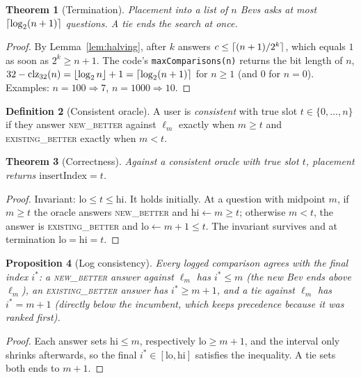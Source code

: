 \documentclass[11pt]{article}
\DeclarePairedDelimiter\floor{\lfloor}{\rfloor}
\DeclarePairedDelimiter\ceil{\lceil}{\rceil}
\newcommand{\code}[1]{\texttt{#1}}
\theoremstyle{plain}
\newtheorem{theorem}{Theorem}[section]
\newtheorem{proposition}[theorem]{Proposition}
\theoremstyle{definition}
\newtheorem{definition}[theorem]{Definition}
\theoremstyle{remark}
\begin{document}
\begin{theorem}[Termination]\label{thm:termination}
Placement into a list of $n$ Bevs asks at most $\ceil{\log_2(n+1)}$ questions. A tie ends the search at once.
\end{theorem}
\begin{proof}
By Lemma~\ref{lem:halving}, after $k$ answers $c \le \ceil{(n+1)/2^k}$, which equals $1$ as soon as $2^k \ge n + 1$. The code's \code{maxComparisons(n)} returns the bit length of $n$, $32 - \mathrm{clz}_{32}(n) = \floor{\log_2 n} + 1 = \ceil{\log_2(n+1)}$ for $n \ge 1$ (and $0$ for $n = 0$). Examples: $n = 100 \Rightarrow 7$, $n = 1000 \Rightarrow 10$.
\end{proof}

\begin{definition}[Consistent oracle]
A user is \emph{consistent} with true slot $t \in \{0, \dots, n\}$ if they answer \textsc{new\_better} against $\ell_m$ exactly when $m \ge t$ and \textsc{existing\_better} exactly when $m < t$.
\end{definition}

\begin{theorem}[Correctness]\label{thm:correctness}
Against a consistent oracle with true slot $t$, placement returns $\mathrm{insertIndex} = t$.
\end{theorem}
\begin{proof}
Invariant: $\mathrm{lo} \le t \le \mathrm{hi}$. It holds initially. At a question with midpoint $m$, if $m \ge t$ the oracle answers \textsc{new\_better} and $\mathrm{hi} \gets m \ge t$; otherwise $m < t$, the answer is \textsc{existing\_better} and $\mathrm{lo} \gets m + 1 \le t$. The invariant survives and at termination $\mathrm{lo} = \mathrm{hi} = t$.
\end{proof}

\begin{proposition}[Log consistency]\label{prop:log}
Every logged comparison agrees with the final index $i^\ast$: a \textsc{new\_better} answer against $\ell_m$ has $i^\ast \le m$ (the new Bev ends above $\ell_m$), an \textsc{existing\_better} answer has $i^\ast \ge m + 1$, and a tie against $\ell_m$ has $i^\ast = m + 1$ (directly below the incumbent, which keeps precedence because it was ranked first).
\end{proposition}
\begin{proof}
Each answer sets $\mathrm{hi} \le m$, respectively $\mathrm{lo} \ge m + 1$, and the interval only shrinks afterwards, so the final $i^\ast \in [\mathrm{lo}, \mathrm{hi}]$ satisfies the inequality. A tie sets both ends to $m + 1$.
\end{proof}
\end{document}
